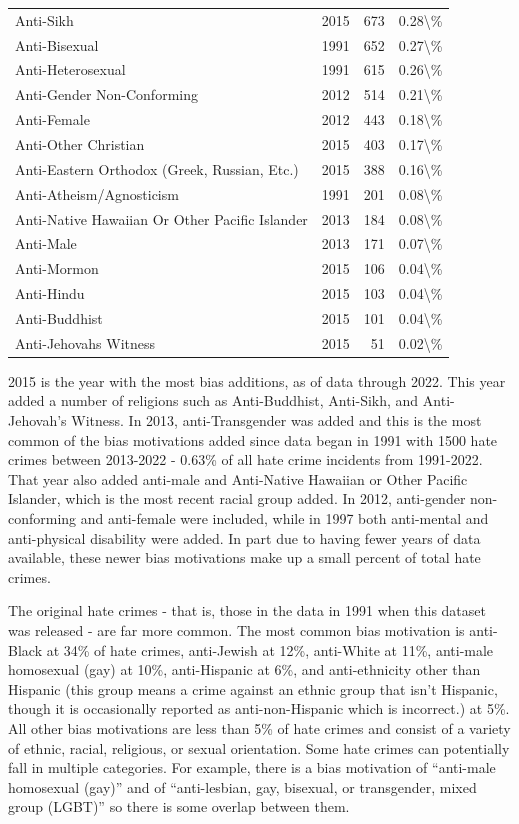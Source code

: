 \documentclass[
  12pt,
  openany]{book}
\begin{document}
\begin{longtable}[t]{lrrl}
Anti-Sikh & 2015 & 673 & 0.28\textbackslash{}\%\\
Anti-Bisexual & 1991 & 652 & 0.27\textbackslash{}\%\\
Anti-Heterosexual & 1991 & 615 & 0.26\textbackslash{}\%\\
Anti-Gender Non-Conforming & 2012 & 514 & 0.21\textbackslash{}\%\\
\addlinespace
Anti-Female & 2012 & 443 & 0.18\textbackslash{}\%\\
Anti-Other Christian & 2015 & 403 & 0.17\textbackslash{}\%\\
Anti-Eastern Orthodox (Greek, Russian, Etc.) & 2015 & 388 & 0.16\textbackslash{}\%\\
Anti-Atheism/Agnosticism & 1991 & 201 & 0.08\textbackslash{}\%\\
Anti-Native Hawaiian Or Other Pacific Islander & 2013 & 184 & 0.08\textbackslash{}\%\\
\addlinespace
Anti-Male & 2013 & 171 & 0.07\textbackslash{}\%\\
Anti-Mormon & 2015 & 106 & 0.04\textbackslash{}\%\\
Anti-Hindu & 2015 & 103 & 0.04\textbackslash{}\%\\
Anti-Buddhist & 2015 & 101 & 0.04\textbackslash{}\%\\
Anti-Jehovahs Witness & 2015 & 51 & 0.02\textbackslash{}\%\\
\bottomrule
\end{longtable}

2015 is the year with the most bias additions, as of data through 2022. This year added a number of religions such as Anti-Buddhist, Anti-Sikh, and Anti-Jehovah's Witness. In 2013, anti-Transgender was added and this is the most common of the bias motivations added since data began in 1991 with 1500 hate crimes between 2013-2022 - 0.63\% of all hate crime incidents from 1991-2022. That year also added anti-male and Anti-Native Hawaiian or Other Pacific Islander, which is the most recent racial group added. In 2012, anti-gender non-conforming and anti-female were included, while in 1997 both anti-mental and anti-physical disability were added. In part due to having fewer years of data available, these newer bias motivations make up a small percent of total hate crimes.

The original hate crimes - that is, those in the data in 1991 when this dataset was released - are far more common. The most common bias motivation is anti-Black at 34\% of hate crimes, anti-Jewish at 12\%, anti-White at 11\%, anti-male homosexual (gay) at 10\%, anti-Hispanic at 6\%, and anti-ethnicity other than Hispanic (this group means a crime against an ethnic group that isn't Hispanic, though it is occasionally reported as anti-non-Hispanic which is incorrect.) at 5\%. All other bias motivations are less than 5\% of hate crimes and consist of a variety of ethnic, racial, religious, or sexual orientation. Some hate crimes can potentially fall in multiple categories. For example, there is a bias motivation of ``anti-male homosexual (gay)'' and of ``anti-lesbian, gay, bisexual, or transgender, mixed group (LGBT)'' so there is some overlap between them.
\end{document}
